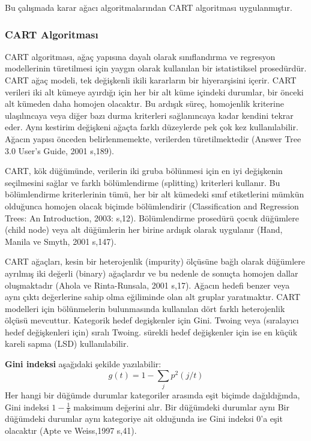 \documentclass[12pt,twoside]{deuthesis}
\begin{document}
Bu çalışmada karar ağacı algoritmalarından CART algoritması uygulanmıştır.

\hypertarget{cart-algoritmasux131}{%
\subsubsection{CART Algoritması}\label{cart-algoritmasux131}}

CART algoritması, ağaç yapısına dayalı olarak sınıflandırma ve regresyon modellerinin türetilmesi için yaygın olarak kullanılan bir istatistiksel prosedürdür. CART ağaç modeli, tek değişkenli ikili kararların bir hiyerarşisini içerir. CART verileri iki alt kümeye ayırdığı için her bir alt küme içindeki durumlar, bir önceki alt kümeden daha homojen olacaktır. Bu ardışık süreç, homojenlik kriterine ulaşılıncaya veya diğer bazı durma kriterleri sağlanıncaya kadar kendini tekrar eder. Aynı kestirim değişkeni ağaçta farklı düzeylerde pek çok kez kullanılabilir. Ağacın yapısı önceden belirlenmemekte, verilerden türetilmektedir (Answer Tree 3.0 User's Guide, 2001 s,189).

CART, kök düğümünde, verilerin iki gruba bölünmesi için en iyi değişkenin seçilmesini sağlar ve farklı bölümlendirme (splitting) kriterleri kullanır. Bu bölümlendirme kriterlerinin tümü, her bir alt kümedeki sınıf etiketlerini mümkün olduğunca homojen olacak biçimde bölümlendirir (Classification and Regression Trees: An Introduction, 2003: s,12). Bölümlendirme prosedürü çocuk düğümlere (child node) veya alt düğümlerin her birine ardışık olarak uygulanır (Hand, Manila ve Smyth, 2001 s,147).

CART ağaçları, kesin bir heterojenlik (impurity) ölçüsüne bağlı olarak düğümlere ayrılmış iki değerli (binary) ağaçlardır ve bu nedenle de sonuçta homojen dallar oluşmaktadır (Ahola ve Rinta-Runsala, 2001 s,17). Ağacın hedefi benzer veya aynı çıktı değerlerine sahip olma eğiliminde olan alt gruplar yaratmaktır. CART modelleri için bölünmelerin bulunmasında kullanılan dört farklı heterojenlik ölçüsü mevcuttur. Kategorik hedef degişkenler için Gini. Twoing veya (sıralayıcı hedef değişkenleri için) sıralı Twoing. sürekli hedef değişkenler için ise en küçük kareli sapma (LSD) kullanılabilir.

\textbf{Gini indeksi} aşağıdaki şekilde yazılabilir:
\[
g(t)=1-\sum_{j} p^{2}(j / t)
\]
Her hangi bir düğümde durumlar kategoriler arasında eşit biçimde dağıldığında, Gini indeksi \(1-\frac{1}{k}\) maksimum değerini alır. Bir düğümdeki durumlar aynı Bir düğümdeki durumlar aynı kategoriye ait olduğunda ise Gini indeksi 0'a eşit olacaktır (Apte ve Weiss,1997 s,41).
\end{document}

